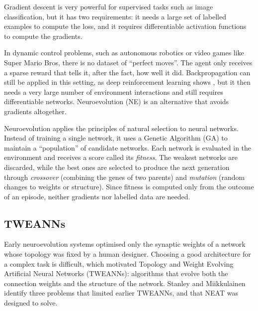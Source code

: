 Gradient descent is very powerful for supervised tasks such as image classification, but it has two requirements: it needs a large set of labelled examples to compute the loss, and it requires differentiable activation functions to compute the gradients.

In dynamic control problems, such as autonomous robotics or video games like Super Mario Bros, there is no dataset of ``perfect moves''. The agent only receives a sparse reward that tells it, after the fact, how well it did. Backpropagation can still be applied in this setting, as deep reinforcement learning shows \cite{mnih2015human}, but it then needs a very large number of environment interactions and still requires differentiable networks. Neuroevolution (NE) is an alternative that avoids gradients altogether.

Neuroevolution applies the principles of natural selection to neural networks. Instead of training a single network, it uses a Genetic Algorithm (GA) to maintain a ``population'' of candidate networks. Each network is evaluated in the environment and receives a score called its \emph{fitness}. The weakest networks are discarded, while the best ones are selected to produce the next generation through \emph{crossover} (combining the genes of two parents) and \emph{mutation} (random changes to weights or structure). Since fitness is computed only from the outcome of an episode, neither gradients nor labelled data are needed.

\subsection{TWEANNs}

Early neuroevolution systems optimised only the synaptic weights of a network whose topology was fixed by a human designer. Choosing a good architecture for a complex task is difficult, which motivated Topology and Weight Evolving Artificial Neural Networks (TWEANNs): algorithms that evolve both the connection weights and the structure of the network. Stanley and Miikkulainen \cite{stanley2002} identify three problems that limited earlier TWEANNs, and that NEAT was designed to solve.

